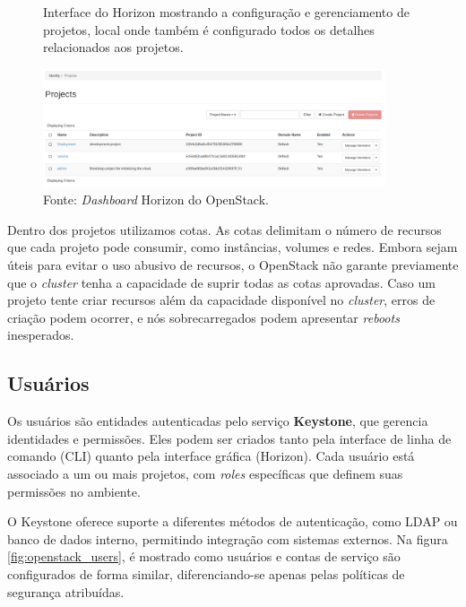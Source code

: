 \begin{figure}[htbp]
    \centering
    \caption{Interface do Horizon mostrando a configuração e gerenciamento de projetos, local onde também é configurado todos os detalhes relacionados aos projetos.}
    \includegraphics[width=0.9\textwidth]{images/openstack_projects.png}
    \caption*{Fonte: \textit{Dashboard} Horizon do OpenStack.}
    \label{fig:openstack_projects}
\end{figure}

Dentro dos projetos utilizamos cotas. As cotas delimitam o número de recursos que cada projeto pode consumir, como instâncias, volumes e redes. Embora sejam úteis para evitar o uso abusivo de recursos, o OpenStack não garante previamente que o \textit{cluster} tenha a capacidade de suprir todas as cotas aprovadas. Caso um projeto tente criar recursos além da capacidade disponível no \textit{cluster}, erros de criação podem ocorrer, e nós sobrecarregados podem apresentar \textit{reboots} inesperados.

\subsection{Usuários}
Os usuários são entidades autenticadas pelo serviço \textbf{Keystone}, que gerencia identidades e permissões. Eles podem ser criados tanto pela interface de linha de comando (CLI) quanto pela interface gráfica (Horizon). Cada usuário está associado a um ou mais projetos, com \textit{roles} específicas que definem suas permissões no ambiente.

O Keystone oferece suporte a diferentes métodos de autenticação, como LDAP ou banco de dados interno, permitindo integração com sistemas externos. Na figura \ref{fig:openstack_users}, é mostrado como usuários e contas de serviço são configurados de forma similar, diferenciando-se apenas pelas políticas de segurança atribuídas.

